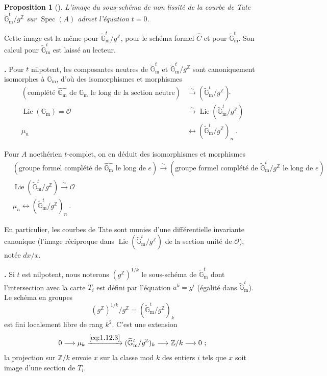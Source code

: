 \documentclass[12pt,a4paper]{amsart}
\theoremstyle{plain}
\newtheorem{proposition}{Proposition}[section]
\theoremstyle{definition}
\theoremstyle{remark}
\DeclareMathOperator{\Spec}{Spec}
\DeclareMathOperator{\Lie}{Lie}
\newcommand{\ZZ}{\mathbb{Z}}
\newcommand{\Gm}{\mathbb{G}_\mathrm{m}}
\newcommand{\Gmtilde}{\widetilde{\mathbb{G}}_\mathrm{m}}
\begin{document}
\begin{proposition}[\theproposition]
L'image du sous-sch\'ema de non lissit\'e de la courbe de Tate $\Gmtilde^t / g^{\ZZ}$ sur $\Spec(A)$ admet l'\'equation $t = 0$.
\end{proposition}

Cette image est la m\^eme pour $\Gmtilde^t / g^{\ZZ}$, pour le sch\'ema formel $\widehat{C}$ et pour $\Gmtilde^t$. Son calcul pour $\Gmtilde^t$ est laiss\'e au lecteur.

\noindent \textbf{\theproposition.} Pour $t$ nilpotent, les composantes neutres de $\Gmtilde^t$ et $\Gmtilde^t / g^{\ZZ}$ sont canoniquement isomorphes \`a $\Gm$, d'o\`u des isomorphismes et morphismes
\begin{align*}
(\text{compl\'et\'e } \widehat{\Gm} \text{ de } \Gm \text{ le long de la section neutre}) &\xrightarrow{\sim} (\Gmtilde^t / g^{\ZZ})\widehat{\ } \\
\Lie(\Gm) = \mathcal{O} &\xrightarrow{\sim} \Lie(\Gmtilde^t / g^{\ZZ}) \\
\mu_n &\longleftrightarrow (\Gmtilde^t / g^{\ZZ})_n \ .
\end{align*}

Pour $A$ noeth\'erien $t$-complet, on en d\'eduit des isomorphismes et morphismes
\begin{align}
\label{eq:1.12.1}
&(\text{groupe formel compl\'et\'e de } \widehat{\Gm} \text{ le long de } e) \xrightarrow{\sim} (\text{groupe formel compl\'et\'e de } \Gmtilde^t / g^{\ZZ} \text{ le long de } e) \\
\label{eq:1.12.2}
&\Lie(\Gmtilde^t / g^{\ZZ}) \xrightarrow{\sim} \mathcal{O} \\
\label{eq:1.12.3}
&\mu_n \longleftrightarrow (\Gmtilde^t / g^{\ZZ})_n \ .
\end{align}

En particulier, les courbes de Tate sont munies d'une diff\'erentielle invariante canonique (l'image r\'eciproque dans $\Lie(\Gmtilde^t / g^{\ZZ})$ de la section unit\'e de $\mathcal{O}$), not\'ee $dx/x$.

\noindent \textbf{\theproposition.} Si $t$ est nilpotent, nous noterons $(g^{\ZZ})^{1/k}$ le sous-sch\'ema de $\Gmtilde^t$ dont l'intersection avec la carte $T_i$ est d\'efini par l'\'equation $a^k = g^i$ (\'egalit\'e dans $\Gmtilde^t$). Le sch\'ema en groupes
\begin{equation}\label{eq:1.13.1}
(g^{\ZZ})^{1/k} / g^{\ZZ} = (\Gmtilde^t / g^{\ZZ})_k
\end{equation}
est fini localement libre de rang $k^2$. C'est une extension
\begin{equation}\label{eq:1.13.2}
0 \longrightarrow \mu_k \xrightarrow{\eqref{eq:1.12.3}} (\Gmtilde^t / g^{\ZZ})_k \longrightarrow \ZZ/k \longrightarrow 0 \ ;
\end{equation}
la projection sur $\ZZ/k$ envoie $x$ sur la classe mod $k$ des entiers $i$ tels que $x$ soit image d'une section de $T_i$.
\end{document}
